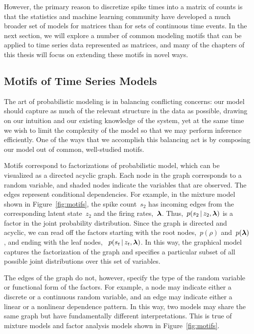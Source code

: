 However, the primary reason to discretize spike times into a matrix of
counts is that the statistics and machine learning community have
developed a much broader set of models for matrices than for sets of
continuous time events.  In the next section, we will explore a number
of common modeling motifs that can be applied to time series data
represented as matrices, and many of the chapters of this thesis will
focus on extending these motifs in novel ways.


\subsection{Motifs of Time Series Models}
\label{sec:motifs}
The art of probabilistic modeling is in balancing conflicting concerns:
our model should capture as much of the relevant structure in the data 
as possible, drawing on our intuition and our existing knowledge of the 
system, yet at the same time we wish to limit the complexity of the model
so that we may perform inference efficiently. One of the ways that we 
accomplish this balancing act is by composing our model out of common,
well-studied motifs. 

Motifs correspond to factorizations of probabilistic model, which can be 
visualized as a directed acyclic graph. Each node in the graph corresponds to a random variable, 
and shaded nodes indicate the variables that are observed. The edges 
represent conditional dependencies. For example, in the mixture model 
shown in Figure~\ref{fig:motifs}, the spike count~$s_2$ has incoming edges 
from the corresponding latent state~$z_2$ and the firing rates,~$\boldsymbol{\lambda}$.
Thus,~$p(s_2 \,|\, z_2, \boldsymbol{\lambda})$ is a factor in the joint probability distribution.
Since the graph is directed and acyclic, we can read off the factors starting 
with the root nodes,~$p(\rho)$ and~$p(\boldsymbol{\lambda})$, and ending with the leaf nodes,
~$p(s_t \,|\, z_t, \boldsymbol{\lambda})$. In this way, the graphical model captures the 
factorization of the graph and specifies a particular subset of all possible
joint distributions over this set of variables. 

The edges of the graph do not, however, specify the type of the random variable 
or functional form of the factors. For example, a node may indicate either a discrete or 
a continuous random variable, and an edge may indicate either a linear or a nonlinear 
dependence pattern. In this way, two models may share the same graph but have 
fundamentally different interpretations. This is true of mixture models 
and factor analysis models shown in Figure~\ref{fig:motifs}.

